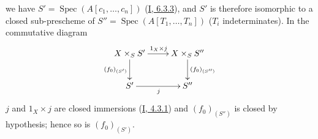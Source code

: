 
we have $S'=\operatorname{Spec}(A[c_1,\ldots,c_n])$
(\hyperref[I.6.3.3]{I, 6.3.3}), and $S'$ is therefore isomorphic to a
closed sub-prescheme of $S''=\operatorname{Spec}(A[T_1,\ldots,T_n])$ ($T_i$
indeterminates). In the commutative diagram
\[
\xymatrix{
X\times_SS'\ar[r]^{1_X\times j}\ar[d]_{(f_0)_{(S')}} &
X\times_SS''\ar[d]^{(f_0)_{(S'')}}\\
S'\ar[r]_j & S''
}
\]
$j$ and $1_X\times j$ are closed immersions
(\hyperref[I.4.3.1]{I, 4.3.1}) and $(f_0)_{(S'')}$ is closed by
hypothesis; hence so is $(f_0)_{(S')}$.


